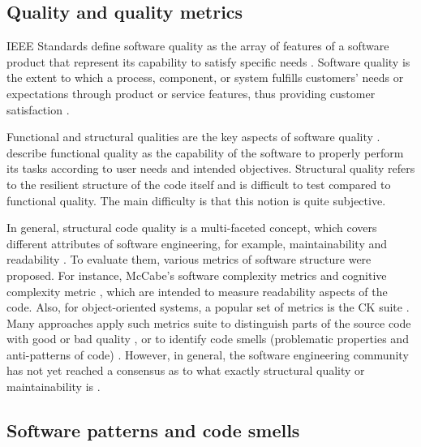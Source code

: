 
\subsection{Quality and quality metrics}
IEEE Standards define software quality as the array of features of
a software product that represent its capability to satisfy
specific needs \citep{Youness2013ComparativeSO}.
Software quality  is the extent to which  a  process,
component,  or  system fulfills customers' needs  or expectations
through product or service features, thus providing customer
satisfaction \citep{Iacob_Constantinescu}.

Functional and  structural qualities are the key  aspects  of  software
quality  \citep{Liu2006AnIE}.  \citet{Farhan} describe
functional  quality  as  the capability  of  the  software
to  properly  perform  its  tasks according  to  user  needs  and
intended  objectives.  Structural quality refers to
the resilient structure of the code itself and is difficult to test
compared to functional quality. The main difficulty is that this
notion is quite subjective.

In general, structural code quality is a multi-faceted concept, which covers
different  attributes of software engineering, for example, maintainability  and
readability \citep{Mohammadi2013AnAO}. To evaluate them, various metrics of
software structure were proposed. For instance,  McCabe’s software complexity
metrics \citep{McCabe1976ACM} and cognitive  complexity metric
\citep{Cognitive}, which are intended to measure readability  aspects of the
code. Also, for object-oriented systems, a popular  set of metrics is the CK
suite \citep{Chidamber1994AMS}. Many approaches apply such metrics suite to
distinguish parts of the source code with good  or bad quality
\citet{Fil2015ACO}, \citet{Shatnawi2010FindingSM}  or to identify code smells
(problematic properties and anti-patterns  of code)
\citet{Ouni2011MaintainabilityDD}. However, in general, the software engineering
community has not yet reached a consensus as to what exactly structural quality
or maintainability is \citep{Broy2006DemystifyingM}.


\subsection{Software patterns and code smells}

